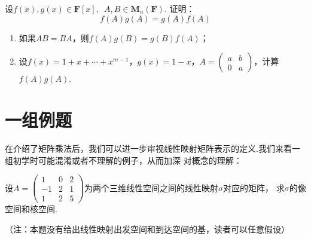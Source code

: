 \begin{example}
    设$f(x),g(x) \in \mathbf{F}[x],\enspace A,B \in \mathbf{M}_n(\mathbf{F})$. 证明：
    \[f(A)g(A)=g(A)f(A)\]
    \begin{enumerate}
        \item 如果$AB=BA$，则$f(A)g(B)=g(B)f(A)$；

        \item 设$f(x)=1+x+\cdots+x^{m-1}$，$g(x)=1-x$，$A=\begin{pmatrix}
            a & b \\ 0 & a
        \end{pmatrix}$，计算$f(A)g(A)$.
    \end{enumerate}
\end{example}
\begin{solution}

\end{solution}

\section{一组例题}
在介绍了矩阵乘法后，我们可以进一步审视线性映射矩阵表示的定义.我们来看一组初学时可能混淆或者不理解的例子，从而加深
对概念的理解：
\begin{example}\label{ex:7:矩阵表示2}
    设$A=\begin{pmatrix}1 & 0 & 2 \\ -1 & 2 & 1 \\ 1 & 2 & 5\end{pmatrix}$为两个三维线性空间之间的线性映射$\sigma$对应的矩阵，
    求$\sigma$的像空间和核空间.
\end{example}
（注：本题没有给出线性映射出发空间和到达空间的基，读者可以任意假设）

